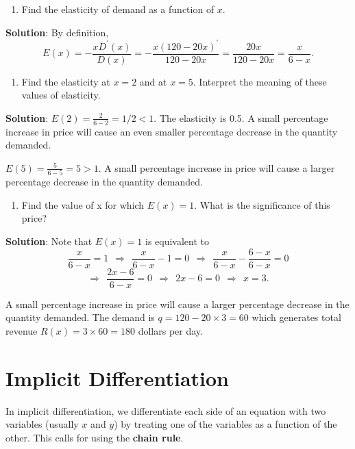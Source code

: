 \documentclass[
]{book}
\providecommand{\tightlist}{%
  \setlength{\itemsep}{0pt}\setlength{\parskip}{0pt}}
\begin{document}
\begin{enumerate}
\def\labelenumi{\arabic{enumi}.}
\tightlist
\item
  Find the elasticity of demand as a function of \(x\).
\end{enumerate}

\textbf{Solution}: By definition,
\[
E(x) = -\frac{xD^\prime(x)}{D(x)} = -\frac{x(120-20x)^\prime}{120-20x} = \frac{20x}{120-20x} = \frac{x}{6-x}.
\]

\begin{enumerate}
\def\labelenumi{\arabic{enumi}.}
\setcounter{enumi}{1}
\tightlist
\item
  Find the elasticity at \(x = 2\) and at \(x = 5\). Interpret the meaning of these values of elasticity.
\end{enumerate}

\textbf{Solution}: \(E(2) = \frac{2}{6-2} = 1/2 < 1\). The elasticity is 0.5. A small percentage increase in price will cause an even smaller percentage decrease in the quantity demanded.

\(E(5) = \frac{5}{6- 5} = 5 > 1\). A small percentage increase in price will cause a larger percentage decrease in the quantity demanded.

\begin{enumerate}
\def\labelenumi{\arabic{enumi}.}
\setcounter{enumi}{2}
\tightlist
\item
  Find the value of x for which \(E(x) = 1\). What is the significance of this price?
\end{enumerate}

\textbf{Solution}: Note that \(E(x) = 1\) is equivalent to
\[
\frac{x}{6 - x} = 1 ~~\Rightarrow~~ \frac{x}{6-x}-1 = 0~~\Rightarrow~~ \frac{x}{6-x}-\frac{6-x}{6-x} = 0
\]
\[
\Rightarrow~~ \frac{2x-6}{6-x} = 0~~\Rightarrow~~ 2x - 6 = 0 ~~\Rightarrow~~ x = 3.
\]

A small percentage increase in price will cause a larger percentage decrease in the quantity demanded. The demand is \(q = 120 - 20\times 3 = 60\) which generates total revenue \(R(x) = 3\times 60 = 180\) dollars per day.

\hfill\break

\hypertarget{implicit-differentiation}{%
\section{Implicit Differentiation}\label{implicit-differentiation}}

In implicit differentiation, we differentiate each side of an equation with two variables (usually \(x\) and \(y\)) by treating one of the variables as a function of the other. This calls for using the \textbf{chain rule}.
\end{document}

